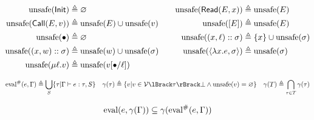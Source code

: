 \begin{align*}
  \text{unsafe}(\textsf{Init})         & \triangleq\varnothing                 &  &  & \text{unsafe}(\textsf{Read}(E,x))                    & \triangleq\text{unsafe}(E)             \\
  \text{unsafe}(\textsf{Call}(E,v))    & \triangleq\text{unsafe}(E)\cup\text{unsafe}(v)    &  &  & \text{unsafe}([E])                       & \triangleq\text{unsafe}(E)             \\
  \text{unsafe}(\bullet)        & \triangleq\varnothing                 &  &  & \text{unsafe}((x,\ell)::\sigma)              & \triangleq\{x\}\cup\text{unsafe}(\sigma) \\
  \text{unsafe}((x,w)::\sigma) & \triangleq\text{unsafe}(w)\cup\text{unsafe}(\sigma) &  &  & \text{unsafe}(\langle\lambda x.e,\sigma\rangle) & \triangleq\text{unsafe}(\sigma)          \\
  \text{unsafe}(\mu\ell.v)      & \triangleq\text{unsafe}(v[\bullet/\ell])
\end{align*}

\[\Abs\eval(e,\Gamma)\triangleq\bigcup_{\Safe}\{\tau|\typejudg{\Gamma}{e}{\tau}{S}\}\quad\gamma(\tau)\triangleq\{v|v\in\ValRel{\tau}\bot\land\unsafe(v)=\varnothing\}\quad\gamma(T)\triangleq\bigcap_{\tau\in T}{\gamma(\tau)}\]

\[\text{eval}(e,\gamma(\Gamma))\subseteq\gamma({\text{eval}}^{\#}(e,\Gamma))\]
